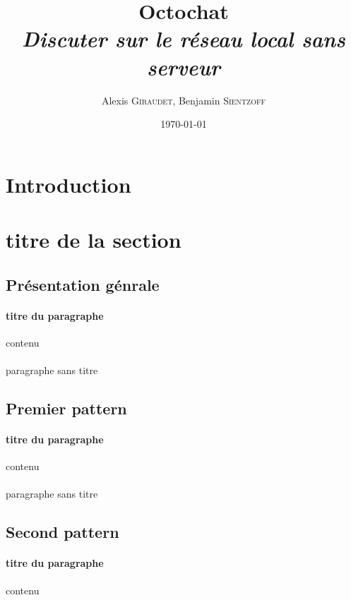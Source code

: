 \documentclass[a4paper]{article}
\title{Octochat \\ \textit{Discuter sur le réseau local sans serveur}}
\author{Alexis \textsc{Giraudet}, Benjamin \textsc{Sientzoff}}
\date{\today}
\begin{document}
	\maketitle
	\vspace{5cm}
	\tableofcontents
	\newpage %
	
	\section*{Introduction}
	
	
	\section{titre de la section}
	
		\subsection{Présentation génrale}
		\paragraph{titre du paragraphe}{contenu}
		\paragraph{}{paragraphe sans titre}
		
		\subsection{Premier pattern}
		\paragraph{titre du paragraphe}{contenu}
		\paragraph{}{paragraphe sans titre}
		
		\subsection{Second pattern}
		\paragraph{titre du paragraphe}{contenu}
\end{document}

